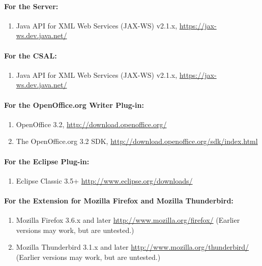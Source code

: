 \paragraph{For the \sa Server:}
\begin{enumerate}
  \item Java API for XML Web Services (JAX-WS) v2.1.x, \url{https://jax-ws.dev.java.net/}
\end{enumerate}

\paragraph{For the CSAL:}
\begin{enumerate}
  \item Java API for XML Web Services (JAX-WS) v2.1.x, \url{https://jax-ws.dev.java.net/}
\end{enumerate}

\paragraph{For the OpenOffice.org Writer Plug-in:}
\begin{enumerate}
\item OpenOffice 3.2, \url{http://download.openoffice.org/}
\item The OpenOffice.org 3.2 SDK,
  \url{http://download.openoffice.org/sdk/index.html}
\end{enumerate}

\paragraph{For the Eclipse Plug-in:}
\begin{enumerate}
\item Eclipse Classic 3.5+ \url{http://www.eclipse.org/downloads/}
\end{enumerate}

\paragraph{For the Extension for Mozilla Firefox and Mozilla Thunderbird:}
\begin{enumerate}
  \item Mozilla Firefox 3.6.x and later \url{http://www.mozilla.org/firefox/} (Earlier versions may work, but are untested.)
  \item Mozilla Thunderbird 3.1.x and later \url{http://www.mozilla.org/thunderbird/} (Earlier versions may work, but are untested.)
\end{enumerate}



